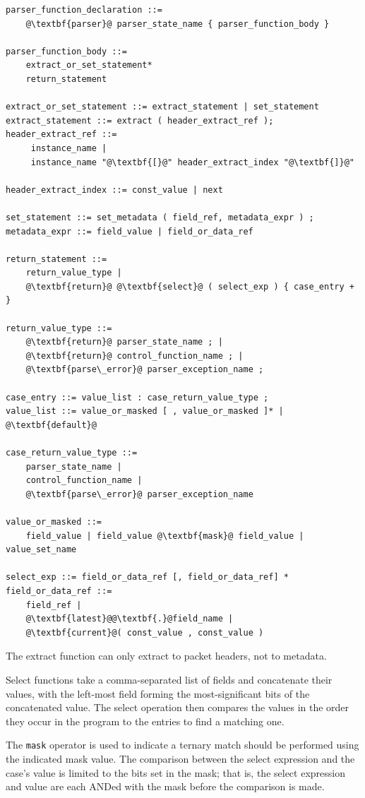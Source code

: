 \documentclass[12pt]{article}
\begin{document}
\begin{lstlisting}[frame=single,backgroundcolor=\color{bnfgreen},escapechar=\@]
parser_function_declaration ::=
    @\textbf{parser}@ parser_state_name { parser_function_body }

parser_function_body ::=
    extract_or_set_statement*
    return_statement

extract_or_set_statement ::= extract_statement | set_statement
extract_statement ::= extract ( header_extract_ref ); 
header_extract_ref ::=
     instance_name |
     instance_name "@\textbf{[}@" header_extract_index "@\textbf{]}@"

header_extract_index ::= const_value | next

set_statement ::= set_metadata ( field_ref, metadata_expr ) ;
metadata_expr ::= field_value | field_or_data_ref

return_statement ::=
    return_value_type |
    @\textbf{return}@ @\textbf{select}@ ( select_exp ) { case_entry + }

return_value_type ::= 
    @\textbf{return}@ parser_state_name ; | 
    @\textbf{return}@ control_function_name ; | 
    @\textbf{parse\_error}@ parser_exception_name ;

case_entry ::= value_list : case_return_value_type ;
value_list ::= value_or_masked [ , value_or_masked ]* | @\textbf{default}@

case_return_value_type ::= 
    parser_state_name | 
    control_function_name | 
    @\textbf{parse\_error}@ parser_exception_name

value_or_masked ::=
    field_value | field_value @\textbf{mask}@ field_value | value_set_name

select_exp ::= field_or_data_ref [, field_or_data_ref] * 
field_or_data_ref ::=
    field_ref |
    @\textbf{latest}@@\textbf{.}@field_name |
    @\textbf{current}@( const_value , const_value )
\end{lstlisting}

The extract function can only extract to packet headers, not to metadata.

Select functions take a comma-separated list of fields and concatenate their 
values, with the left-most field forming the most-significant bits of the 
concatenated value.  The select operation then compares the values in the 
order they occur in the program to the entries to find a matching one.

The \texttt{mask} operator is used to indicate a ternary match should be performed 
using the indicated mask value. The comparison between the select expression 
and the case's value is limited to the bits set in the mask; that is, the 
select expression and value are each ANDed with the mask before the comparison 
is made. 
\end{document}
